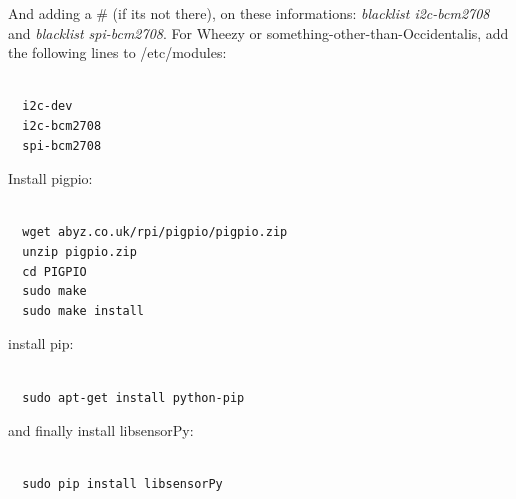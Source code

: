\documentclass{acm_proc_article-sp}
\begin{document}
And adding a \# (if its not there), on these informations: \textit{blacklist i2c-bcm2708} and \textit{blacklist spi-bcm2708}.
\newline
\newline
For Wheezy or something-other-than-Occidentalis, add the following lines to /etc/modules: 
\renewcommand{\theFancyVerbLine}{
  \sffamily\textcolor[rgb]{0.5,0.5,0.5}{\scriptsize\arabic{FancyVerbLine}}}
\begin{verbatim}

  i2c-dev
  i2c-bcm2708
  spi-bcm2708	

\end{verbatim}

Install pigpio:
\begin{verbatim}

  wget abyz.co.uk/rpi/pigpio/pigpio.zip
  unzip pigpio.zip
  cd PIGPIO
  sudo make
  sudo make install	
\end{verbatim}

install pip:
\begin{verbatim}

  sudo apt-get install python-pip
\end{verbatim}

and finally install libsensorPy:
\begin{verbatim}

  sudo pip install libsensorPy
\end{verbatim}
\end{document}
